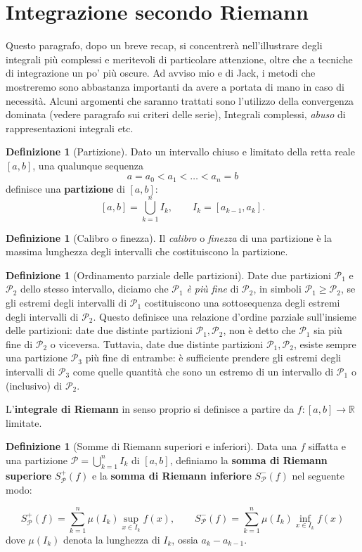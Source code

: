 \documentclass[a4paper,twoside]{article}
\newcommand{\R}{\mathbb{R}}
\theoremstyle{definition}
\newtheorem{definizione}[theorem]{Definizione}
\numberwithin{theorem}{section}
\begin{document}
\section{Integrazione secondo Riemann}
Questo paragrafo, dopo un breve recap, si concentrerà nell'illustrare degli integrali più complessi e meritevoli di particolare attenzione, oltre che a tecniche di integrazione un po' più oscure. Ad avviso mio e di Jack, i metodi che mostreremo sono abbastanza importanti da avere a portata di mano in caso di necessità. Alcuni argomenti che saranno trattati sono l'utilizzo della convergenza dominata (vedere paragrafo sui criteri delle serie), Integrali complessi, \emph{abuso} di rappresentazioni integrali etc.
\begin{definizione}[Partizione] Dato un intervallo chiuso e limitato della retta reale $[a,b]$, una qualunque sequenza 
$$ a=a_0 < a_1 < \ldots < a_n = b $$
definisce una \textbf{partizione} di $[a,b]$:
$$ [a,b]=\bigcup_{k=1}^{n} I_k,\qquad I_k=[a_{k-1},a_{k}]. $$ 
\end{definizione}
\begin{definizione}[Calibro o finezza] Il \emph{calibro} o \emph{finezza} di una partizione è la massima lunghezza degli intervalli che costituiscono la partizione. 
\end{definizione}
\begin{definizione}[Ordinamento parziale delle partizioni] Date due partizioni $\mathcal{P}_1$ e $\mathcal{P}_2$ dello stesso intervallo, diciamo che $\mathcal{P}_1$ \emph{è più fine} di $\mathcal{P}_2$, in simboli $\mathcal{P}_1 \geq \mathcal{P}_2$, se gli estremi degli intervalli di $\mathcal{P}_1$ costituiscono una sottosequenza degli estremi degli intervalli di $\mathcal{P}_2$. Questo definisce una relazione d'ordine parziale sull'insieme delle partizioni: date due distinte partizioni $\mathcal{P}_1,\mathcal{P}_2$, non è detto che $\mathcal{P}_1$ sia più fine di $\mathcal{P}_2$ o viceversa. Tuttavia, date due distinte partizioni $\mathcal{P}_1,\mathcal{P}_2$, esiste sempre una partizione $\mathcal{P}_3$ più fine di entrambe: è sufficiente prendere gli estremi degli intervalli di $\mathcal{P}_3$ come quelle quantità che sono un estremo di un intervallo di $\mathcal{P}_1$ o (inclusivo) di $\mathcal{P}_2$.
\end{definizione}
L'\textbf{integrale di Riemann} in senso proprio si definisce a partire da $f:[a,b]\to\R$ limitate.

\begin{definizione}[Somme di Riemann superiori e inferiori]
Data una $f$ siffatta e una partizione $\mathcal{P}=\bigcup_{k=1}^{n}I_k$ di $[a,b]$, definiamo la \textbf{somma di Riemann superiore} $S^+_{\mathcal{P}}(f)$ e la  \textbf{somma di Riemann inferiore} $S^-_{\mathcal{P}}(f)$ nel seguente modo:

$$ S^+_{\mathcal{P}}(f) = \sum_{k=1}^{n} \mu(I_k) \sup_{x\in I_k} f(x), \qquad S^-_{\mathcal{P}}(f) = \sum_{k=1}^{n} \mu(I_k) \inf_{x\in I_k} f(x)$$
dove $\mu(I_k)$ denota la lunghezza di $I_k$, ossia $a_{k}-a_{k-1}$.
\end{definizione}
\end{document}
